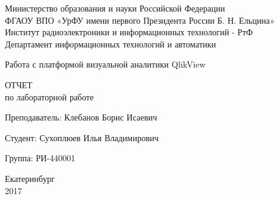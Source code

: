 \begin{center}
    Министерство образования и науки Российской Федерации\\
    ФГАОУ ВПО  «УрФУ имени первого Президента России Б. Н. Ельцина»\\
    Институт радиоэлектроники и информационных технологий - РтФ\\
    Департамент информационных технологий и автоматики
    \par
    \vspace{4.5cm}
    \Large{
    Работа с платформой визуальной аналитики QlikView


      \par
      \vspace{0.5cm}

      ОТЧЕТ\\
      по лабораторной работе
    }

    \vspace{4cm}
    {
      Преподаватель: \hfill Клебанов Борис Исаевич
    }
    \par
    {
      Студент: \hfill Сухоплюев Илья Владимирович
    }
    \par
    {
      Группа: \hfill РИ-440001
    }

    \par
    \vspace{3.5cm}
    Екатеринбург\\
    2017
\end{center}
